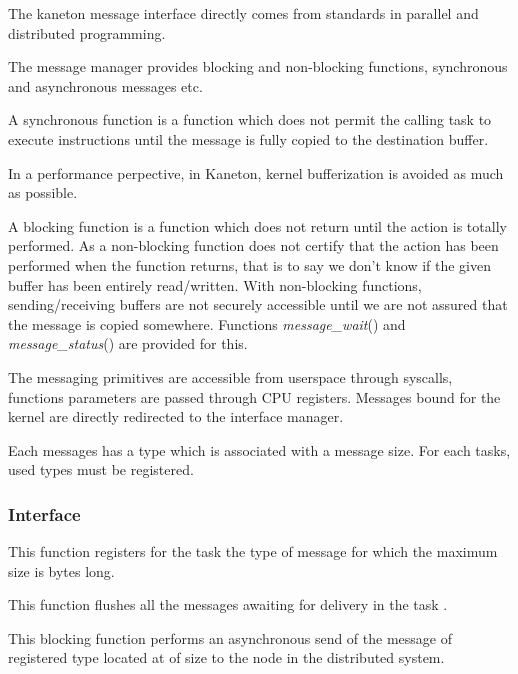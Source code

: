The kaneton message interface directly comes from standards in parallel
and distributed programming.

The message manager provides blocking and non-blocking functions,
synchronous and asynchronous messages etc.

A synchronous function is a function which does not permit the calling
task to execute instructions until the message is fully copied to the
destination buffer.

In a performance perpective, in Kaneton, kernel bufferization is avoided
as much as possible.

A blocking function is a function which does not return until the
action is totally performed. As a non-blocking function does not certify
that the action has been performed when the function returns, that is to
say we don't know if the given buffer has been entirely read/written. With
non-blocking functions, sending/receiving buffers are not securely accessible
until we are not assured that the message is copied somewhere. Functions
\textit{message\_wait}() and \textit{message\_status}() are provided for
this.

The messaging primitives are accessible from userspace through syscalls,
functions parameters are passed through CPU registers. Messages bound for
the kernel are directly redirected to the interface manager.

Each messages has a type which is associated with a message size. For each
tasks, used types must be registered.


%
%

\subsubsection{Interface}

	 {
	   This function registers for the task  the type
	   of message  for which the maximum size is
	    bytes long.
	 }

	 {
	   This function flushes all the messages awaiting for delivery
	   in the task .
	 }

	 {
	   This blocking function performs an asynchronous send of the
	   message of registered type  located at
	    of size  to the node
	    in the distributed system.
	 }

